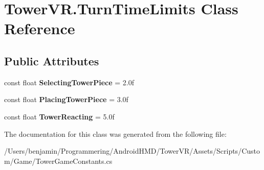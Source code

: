 \hypertarget{class_tower_v_r_1_1_turn_time_limits}{}\section{Tower\+V\+R.\+Turn\+Time\+Limits Class Reference}
\label{class_tower_v_r_1_1_turn_time_limits}
\subsection*{Public Attributes}
\begin{DoxyCompactItemize}
\item 
const float {\bfseries Selecting\+Tower\+Piece} = 2.\+0f\hypertarget{class_tower_v_r_1_1_turn_time_limits_ae3c0742a7d389534a0b3b1c4d229dc32}{}\label{class_tower_v_r_1_1_turn_time_limits_ae3c0742a7d389534a0b3b1c4d229dc32}

\item 
const float {\bfseries Placing\+Tower\+Piece} = 3.\+0f\hypertarget{class_tower_v_r_1_1_turn_time_limits_a90c299e1f4b47955972087aaee4c81e4}{}\label{class_tower_v_r_1_1_turn_time_limits_a90c299e1f4b47955972087aaee4c81e4}

\item 
const float {\bfseries Tower\+Reacting} = 5.\+0f\hypertarget{class_tower_v_r_1_1_turn_time_limits_a18f1e3032ab93929fd42da3da442461a}{}\label{class_tower_v_r_1_1_turn_time_limits_a18f1e3032ab93929fd42da3da442461a}

\end{DoxyCompactItemize}


The documentation for this class was generated from the following file\+:\begin{DoxyCompactItemize}
\item 
/\+Users/benjamin/\+Programmering/\+Android\+H\+M\+D/\+Tower\+V\+R/\+Assets/\+Scripts/\+Custom/\+Game/Tower\+Game\+Constants.\+cs\end{DoxyCompactItemize}
